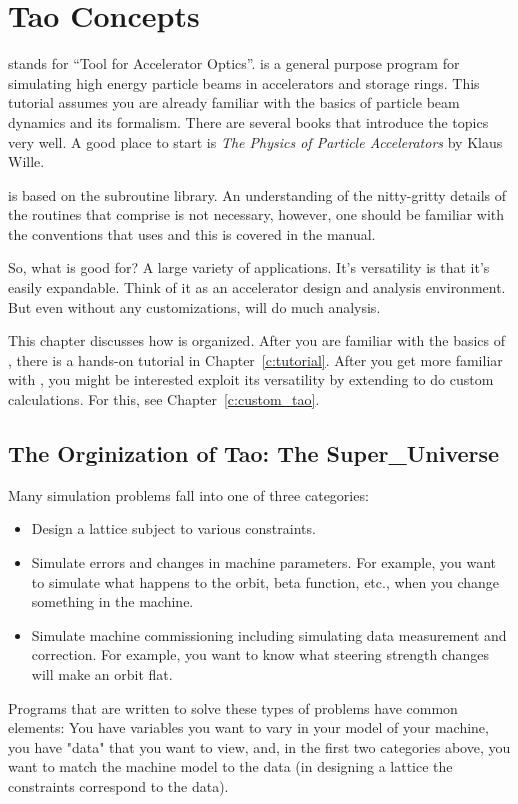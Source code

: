 \chapter{Tao Concepts}
\label{c:concepts}

\tao stands for ``Tool for Accelerator Optics''. \tao is a general
purpose program for simulating high energy particle beams in
accelerators and storage rings. This tutorial assumes you are already
familiar with the basics of particle beam dynamics and its
formalism. There are several books that introduce the topics very
well. A good place to start is \textit{The Physics of Particle
Accelerators} by Klaus Wille.

\tao is based on the \bmad\cite{b:bmad} subroutine library. An
understanding of the nitty-gritty details of the routines that
comprise \bmad is not necessary, however, one should be familiar with
the conventions that \bmad uses and this is covered in the \bmad
manual.

So, what is \tao good for? A large variety of applications. It's
versatility is that it's easily expandable. Think of it as an
accelerator design and analysis environment. But even without any
customizations, \tao will do much analysis. 

This chapter discusses how \tao is organized. After you are familiar
with the basics of \tao, there is a hands-on tutorial in
Chapter~\ref{c:tutorial}. After you get more familiar with \tao, you
might be interested exploit its versatility by extending \tao to do
custom calculations. For this, see Chapter~\ref{c:custom_tao}.

\section{The Orginization of Tao: The Super\_Universe}
\label{s:orginization}

Many simulation problems fall into one of three categories: 
\begin{itemize}
\item 
Design a lattice subject to various constraints.
\item
Simulate errors and changes in machine parameters. For example, you want to
simulate what happens to the orbit, beta function, etc., when you change
something in the machine. 
\item 
Simulate machine commissioning including simulating data measurement and
correction. For example, you want to know what steering strength changes will
make an orbit flat.
\end{itemize}
Programs that are written to solve these types of problems have common
elements: You have variables you want to vary in your model of your
machine, you have "data" that you want to view, and, in the first two
categories above, you want to match the machine model to the data (in
designing a lattice the constraints correspond to the data).

